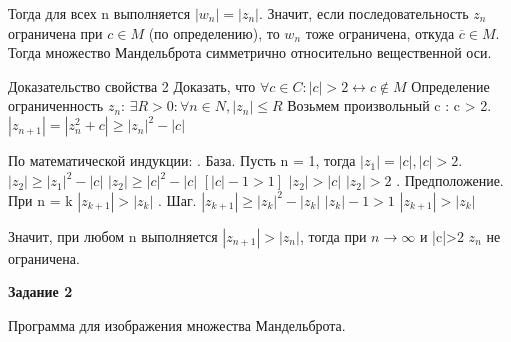 \documentclass[a4paper,12pt]{article}
\begin{document}
Тогда для всех n выполняется $|w_n|=|z_n|$. Значит, если последовательность $z_n$ ограничена при $c \in M$ (по определению), то $w_n$ тоже ограничена, откуда $\overline{c} \in M$. Тогда множество Мандельброта симметрично относительно вещественной оси. \newline

Доказательство свойства 2 \newline
Доказать, что $\forall c \in C: |c|>2 \leftrightarrow  c \notin M$ \newline
Определение ограниченность $z_n$: \newline
$\exists R > 0 : \forall n \in N, |z_n| \leq R$ \newline
Возьмем произвольный c : c > 2. \newline
$|z_{n+1}|=|z_n^2+c|\geq|z_n|^2-|c|$ \newline

По математической индукции: . База. Пусть n = 1, тогда $|z_1|=|c|, |c|>2$. \newline
$|z_2|\geq|z_1|^2-|c|$ \newline
$|z_2|\geq |c|^2 -|c|$ \newline
$[|c|-1 >1]$ \newline
$|z_2|>|c|$ \newline
$|z_2|>2$ . Предположение. При n = k \newline
$|z_{k+1}|>|z_k|$ . Шаг.  \newline
$|z_{k+1}|\geq |z_k|^2-|z_k|$ \newline
$|z_k|-1>1$ \newline
$|z_{k+1}|>|z_k|$ \newline

Значит, при любом n выполняется $|z_{n+1}|>|z_n|$, тогда при $n\rightarrow \infty$ и |c|>2 $z_n$ не ограничена.    \newline

\newpage

\begin{center}
    \textbf{Задание 2}
\end{center}
Программа для изображения множества Мандельброта.
\end{document}
